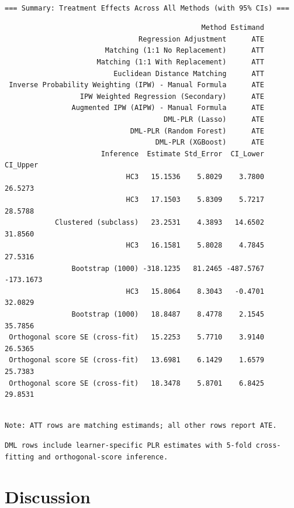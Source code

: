 \documentclass[
  letterpaper,
  DIV=11,
  numbers=noendperiod]{scrartcl}
\begin{document}
\begin{verbatim}

=== Summary: Treatment Effects Across All Methods (with 95% CIs) ===
\end{verbatim}

\begin{verbatim}
                                               Method Estimand
                                Regression Adjustment      ATE
                        Matching (1:1 No Replacement)      ATT
                      Matching (1:1 With Replacement)      ATT
                          Euclidean Distance Matching      ATT
 Inverse Probability Weighting (IPW) - Manual Formula      ATE
                  IPW Weighted Regression (Secondary)      ATE
                Augmented IPW (AIPW) - Manual Formula      ATE
                                      DML-PLR (Lasso)      ATE
                              DML-PLR (Random Forest)      ATE
                                    DML-PLR (XGBoost)      ATE
                       Inference  Estimate Std_Error  CI_Lower  CI_Upper
                             HC3   15.1536    5.8029    3.7800   26.5273
                             HC3   17.1503    5.8309    5.7217   28.5788
            Clustered (subclass)   23.2531    4.3893   14.6502   31.8560
                             HC3   16.1581    5.8028    4.7845   27.5316
                Bootstrap (1000) -318.1235   81.2465 -487.5767 -173.1673
                             HC3   15.8064    8.3043   -0.4701   32.0829
                Bootstrap (1000)   18.8487    8.4778    2.1545   35.7856
 Orthogonal score SE (cross-fit)   15.2253    5.7710    3.9140   26.5365
 Orthogonal score SE (cross-fit)   13.6981    6.1429    1.6579   25.7383
 Orthogonal score SE (cross-fit)   18.3478    5.8701    6.8425   29.8531
\end{verbatim}

\begin{verbatim}

Note: ATT rows are matching estimands; all other rows report ATE.
\end{verbatim}

\begin{verbatim}
DML rows include learner-specific PLR estimates with 5-fold cross-fitting and orthogonal-score inference.
\end{verbatim}

\section{Discussion}\label{discussion}
\end{document}
